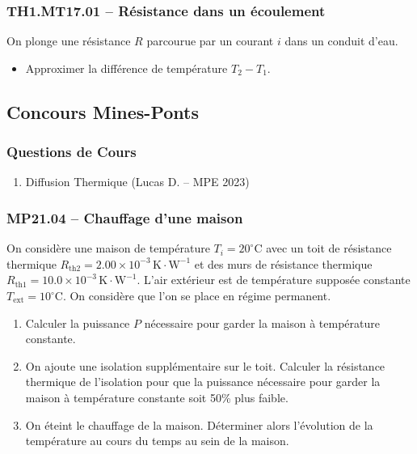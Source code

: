 \newpage
\subsubsection*{TH1.MT17.01 -- Résistance dans un écoulement}

\begin{center}
\end{center}

On plonge une résistance $R$ parcourue par un courant $i$ dans un conduit d'eau.

\begin{itemize}[label=\textbullet]
\item Approximer la différence de température $T_{2} - T_{1}$.
\end{itemize}

\newpage
\subsection*{Concours Mines-Ponts}

\subsubsection*{Questions de Cours}
\begin{enumerate}
\item Diffusion Thermique (Lucas D. -- MPE 2023)
\end{enumerate}

\subsubsection*{MP21.04 -- Chauffage d'une maison  \lesdeux}

On considère une maison de température $T_{i} = 20^\circ\text{C}$ avec un toit de résistance thermique $R_{\text{th2}} = 2.00 \times 10^{-3}\,\text{K}\cdot\text{W}^{-1}$ et des murs de résistance thermique $R_{\text{th1}} = 10.0 \times 10^{-3}\,\text{K}\cdot\text{W}^{-1}$. L'air extérieur est de température supposée constante $T_{\text{ext}} = 10^\circ\text{C}$. On considère que l'on se place en régime permanent.

\begin{enumerate}
\item Calculer la puissance $P$ nécessaire pour garder la maison à température constante.
\item On ajoute une isolation supplémentaire sur le toit. Calculer la résistance thermique de l'isolation pour que la puissance nécessaire pour garder la maison à température constante soit 50\% plus faible.
\item On éteint le chauffage de la maison. Déterminer alors l'évolution de la température au cours du temps au sein de la maison.
\end{enumerate}

